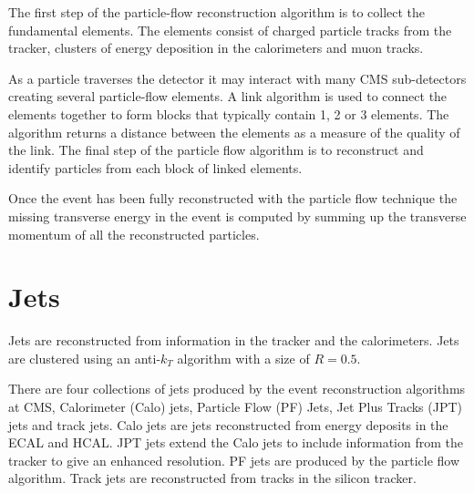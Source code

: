 The first step of the particle-flow reconstruction algorithm is to collect the
fundamental elements. The elements consist of charged particle tracks from the
tracker, clusters of energy deposition in the calorimeters and muon tracks.

As a particle traverses the detector it may interact with many CMS sub-detectors
creating several particle-flow elements. A link algorithm is used to connect
the elements together to form blocks that typically contain 1, 2 or 3 elements.
The algorithm returns a distance between the elements as a measure of the
quality of the link. The final step of the particle flow algorithm is to
reconstruct and identify particles from each block of linked elements\cite{PF}.

Once the event has been fully reconstructed with the particle flow technique
the missing transverse energy in the event is computed by
summing up the transverse momentum of all the reconstructed particles\cite{PF}.

\section{Jets}
Jets are reconstructed from information in the tracker and the calorimeters.
Jets are clustered using an anti-$k_T$ algorithm  with a size of
$R=0.5$.

There are four collections of jets produced by the event reconstruction
algorithms at CMS, Calorimeter (Calo) jets, Particle Flow (PF) Jets, Jet Plus
Tracks (JPT) jets and track jets. Calo jets are jets reconstructed from energy
deposits in the ECAL and HCAL. JPT jets extend the Calo jets to include
information from the tracker to give an enhanced \pT resolution. PF jets are
produced by the particle flow algorithm\cite{PF}. Track jets are reconstructed from
tracks in the silicon tracker.

